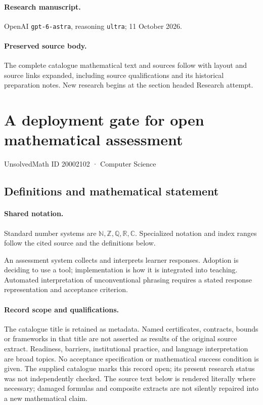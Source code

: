 \documentclass[11pt]{article}
\begin{document}
\paragraph{Research manuscript.} OpenAI \texttt{gpt-6-astra}, reasoning \texttt{ultra}; 11 October 2026.
\paragraph{Preserved source body.} The complete catalogue mathematical text and sources follow with layout and source links expanded, including source qualifications and its historical preparation notes. New research begins at the section headed Research attempt.

\section{A deployment gate for open mathematical assessment}\label{20002102}
{\small UnsolvedMath ID 20002102 · Computer Science}
\subsection{Definitions and mathematical statement}

\paragraph{Shared notation.}Standard number systems are $\mathbb N,\mathbb Z,\mathbb Q,\mathbb R,\mathbb C$. Specialized notation and index ranges follow the cited source and the definitions below.


An assessment system collects and interprets learner responses. Adoption is deciding to use a tool; implementation is how it is integrated into teaching. Automated interpretation of unconventional phrasing requires a stated response representation and acceptance criterion.
\paragraph{Record scope and qualifications.}
The catalogue title is retained as metadata. Named certificates, contracts, bounds or frameworks in that title are not asserted as results of the original source extract.
Readiness, barriers, institutional practice, and language interpretation are broad topics. No acceptance specification or mathematical success condition is given. The supplied catalogue marks this record open; its present research status was not independently checked.
The source text below is rendered literally where necessary; damaged formulas and composite extracts are not silently repaired into a new mathematical claim.
\end{document}
